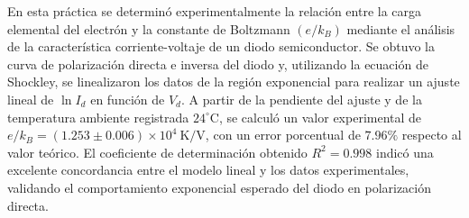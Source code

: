 \noindent En esta práctica se determinó experimentalmente la relación entre la carga elemental del electrón y la constante de Boltzmann $(e/k_B)$ mediante el análisis de la característica corriente-voltaje de un diodo semiconductor. Se obtuvo la curva de polarización directa e inversa del diodo y, utilizando la ecuación de Shockley, se linealizaron los datos de la región exponencial para realizar un ajuste lineal de $\ln I_d$ en función de $V_d$. A partir de la pendiente del ajuste y de la temperatura ambiente registrada $24^\circ\mathrm{C}$, se calculó un valor experimental de $e/k_B=(1.253\pm0.006)\times10^4\ \mathrm{K/V}$, con un error porcentual de $7.96 \%$ respecto al valor teórico. El coeficiente de determinación obtenido $R^2=0.998$ indicó una excelente concordancia entre el modelo lineal y los datos experimentales, validando el comportamiento exponencial esperado del diodo en polarización directa. \\
        